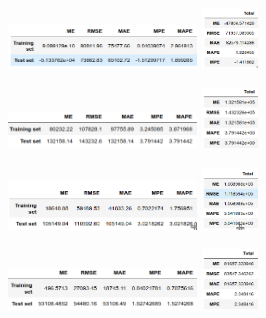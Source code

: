 \documentclass[c, dvipsnames]{beamer}  %
\begin{document}
\begin{frame}[shrink=5]
\frametitle{\insertsection} 

%
%

\hfil\hfil\includegraphics[width=5cm]{screenshot031}\hfil\hfil
\includegraphics[width=1.5cm]{screenshot030}\newline


\hfil\hfil\includegraphics[width=5cm]{screenshot039}\hfil\hfil
\includegraphics[width=1.5cm]{screenshot033}\newline

\hfil\hfil\includegraphics[width=5cm]{screenshot040}\hfil\hfil
\includegraphics[width=1.5cm]{screenshot035}\newline


\hfil\hfil\includegraphics[width=5cm]{screenshot041}\hfil\hfil
\includegraphics[width=1.5cm]{screenshot036}\newline


\end{frame}
\end{document}
